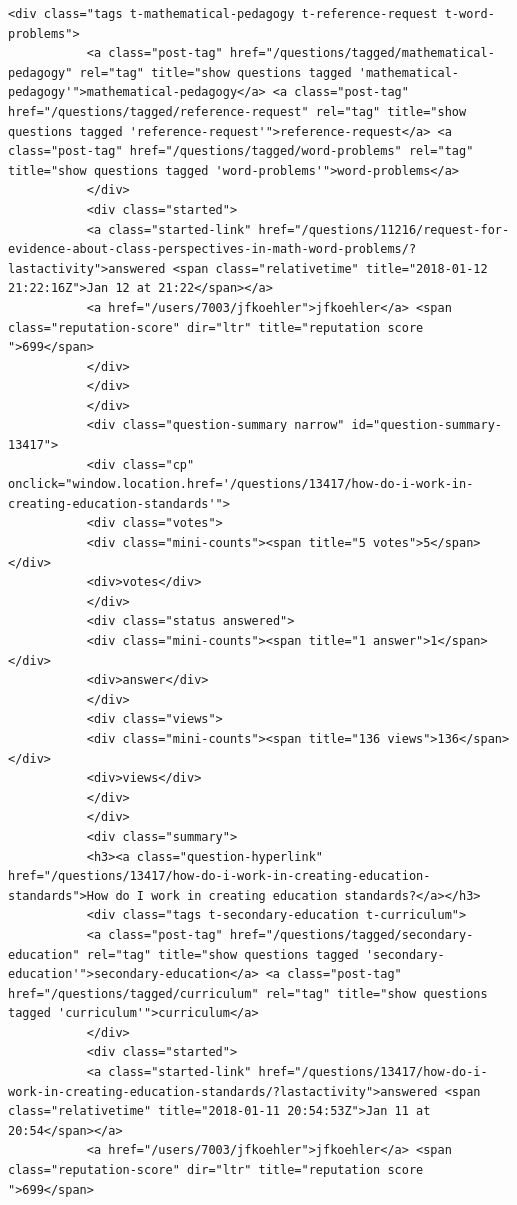 \documentclass[11pt]{article}
\begin{document}
\begin{Verbatim}[commandchars=\\\{\}]
           <div class="tags t-mathematical-pedagogy t-reference-request t-word-problems">
           <a class="post-tag" href="/questions/tagged/mathematical-pedagogy" rel="tag" title="show questions tagged 'mathematical-pedagogy'">mathematical-pedagogy</a> <a class="post-tag" href="/questions/tagged/reference-request" rel="tag" title="show questions tagged 'reference-request'">reference-request</a> <a class="post-tag" href="/questions/tagged/word-problems" rel="tag" title="show questions tagged 'word-problems'">word-problems</a>
           </div>
           <div class="started">
           <a class="started-link" href="/questions/11216/request-for-evidence-about-class-perspectives-in-math-word-problems/?lastactivity">answered <span class="relativetime" title="2018-01-12 21:22:16Z">Jan 12 at 21:22</span></a>
           <a href="/users/7003/jfkoehler">jfkoehler</a> <span class="reputation-score" dir="ltr" title="reputation score ">699</span>
           </div>
           </div>
           </div>
           <div class="question-summary narrow" id="question-summary-13417">
           <div class="cp" onclick="window.location.href='/questions/13417/how-do-i-work-in-creating-education-standards'">
           <div class="votes">
           <div class="mini-counts"><span title="5 votes">5</span></div>
           <div>votes</div>
           </div>
           <div class="status answered">
           <div class="mini-counts"><span title="1 answer">1</span></div>
           <div>answer</div>
           </div>
           <div class="views">
           <div class="mini-counts"><span title="136 views">136</span></div>
           <div>views</div>
           </div>
           </div>
           <div class="summary">
           <h3><a class="question-hyperlink" href="/questions/13417/how-do-i-work-in-creating-education-standards">How do I work in creating education standards?</a></h3>
           <div class="tags t-secondary-education t-curriculum">
           <a class="post-tag" href="/questions/tagged/secondary-education" rel="tag" title="show questions tagged 'secondary-education'">secondary-education</a> <a class="post-tag" href="/questions/tagged/curriculum" rel="tag" title="show questions tagged 'curriculum'">curriculum</a>
           </div>
           <div class="started">
           <a class="started-link" href="/questions/13417/how-do-i-work-in-creating-education-standards/?lastactivity">answered <span class="relativetime" title="2018-01-11 20:54:53Z">Jan 11 at 20:54</span></a>
           <a href="/users/7003/jfkoehler">jfkoehler</a> <span class="reputation-score" dir="ltr" title="reputation score ">699</span>

\end{Verbatim}
\end{document}
